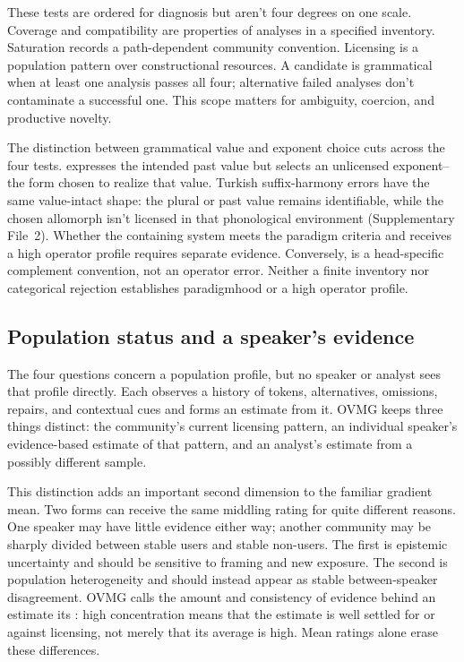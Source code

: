 These tests are ordered for diagnosis but aren't four degrees on one scale.
Coverage and compatibility are properties of analyses in a specified
inventory. Saturation records a path-dependent community convention. Licensing
is a population pattern over constructional resources. A candidate is
grammatical when at least one analysis passes all four; alternative failed
analyses don't contaminate a successful one. This scope matters for ambiguity,
coercion, and productive novelty.

The distinction between grammatical value and exponent choice cuts across the
four tests.  expresses the intended past value but selects
an unlicensed exponent--the form chosen to realize that value. Turkish
suffix-harmony errors have the same value-intact shape: the plural or past value
remains identifiable, while the chosen allomorph isn't licensed in that
phonological environment (Supplementary File~2). Whether the containing system
meets the paradigm criteria and receives a high operator profile requires
separate evidence.
Conversely,  is a head-specific complement convention,
not an operator error. Neither a finite inventory nor categorical rejection
establishes paradigmhood or a high operator profile.

\subsection{Population status and a speaker's evidence}
\label{sec:posterior-existence}
\label{sec:objective-G}

The four questions concern a population profile, but no speaker or analyst sees
that profile directly. Each observes a history of tokens, alternatives,
omissions, repairs, and contextual cues and forms an estimate from it. OVMG
keeps three things distinct: the community's current licensing
pattern, an individual speaker's evidence-based estimate of that pattern, and an
analyst's estimate from a possibly different sample.

This distinction adds an important second dimension to the familiar gradient
mean. Two forms can receive the same middling rating for quite different
reasons. One speaker may have little evidence either way; another community may
be sharply divided between stable users and stable non-users. The first is
epistemic uncertainty and should be sensitive to framing and new exposure. The
second is population heterogeneity and should instead appear as stable
between-speaker disagreement. OVMG calls the amount and consistency of evidence
behind an estimate its : high concentration means
that the estimate is well settled for or against licensing, not merely that its
average is high. Mean ratings alone erase these differences.

